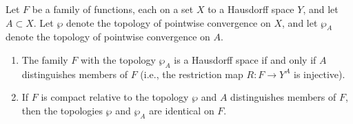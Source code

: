 Let $F$ be a family of functions, each on a set $X$ to a Hausdorff space $Y$, and let $A \subset X$. Let $\wp$ denote the topology of pointwise convergence on $X$, and let $\wp_A$ denote the topology of pointwise convergence on $A$.

\begin{enumerate}
  \item[(i)] The family $F$ with the topology $\wp_A$ is a Hausdorff space if and only if $A$ distinguishes members of $F$ (i.e., the restriction map $R : F \to Y^A$ is injective).
  \item[(ii)] If $F$ is compact relative to the topology $\wp$ and $A$ distinguishes members of $F$, then the topologies $\wp$ and $\wp_A$ are identical on $F$.
\end{enumerate}
